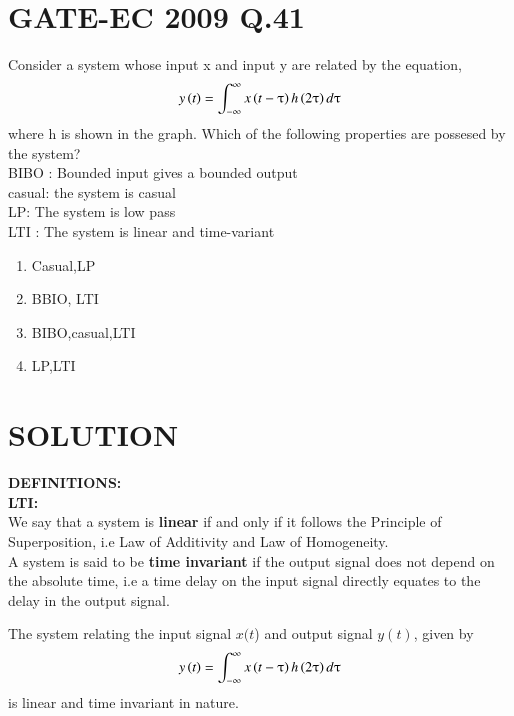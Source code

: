 \documentclass[journal,12pt,twocolumn]{IEEEtran}
\begin{document}
\section*{GATE-EC 2009 Q.41}
Consider a system whose input x and input y are related by the equation,
$$y\left(t\right)=\int_{-\infty}^{\infty}x\left(t-\uptau\right)h\left(2\uptau\right)d\uptau$$
where h is shown in the graph.
Which of the following properties are possesed by the system?\\
BIBO : Bounded input gives a bounded output\\
casual: the system is casual\\
LP: The system is low pass\\
LTI : The system is linear and time-variant\\
\begin{enumerate}
    \item Casual,LP 
    \item BBIO, LTI
    \item BIBO,casual,LTI
    \item LP,LTI
\end{enumerate}
\section*{SOLUTION}
\textbf{DEFINITIONS:}\\
\textbf{LTI:}\\
We say that a system is\textbf{ linear} if and only if it follows the Principle of Superposition, i.e Law of Additivity and Law of Homogeneity.\\
A system is said to be \textbf{time invariant} if the output signal does not depend on the absolute time, i.e a time delay on the input signal directly equates to the delay in the output signal.
\label{T}

The system relating the input signal $x(t$) and output signal $y(t)$, given by 
\begin{align}
     y\left(t\right)=\int_{-\infty}^{\infty}x\left(t-\uptau\right)h\left(2\uptau\right)d\uptau \label{L}
\end{align}
is linear and time invariant in nature.
\end{document}
